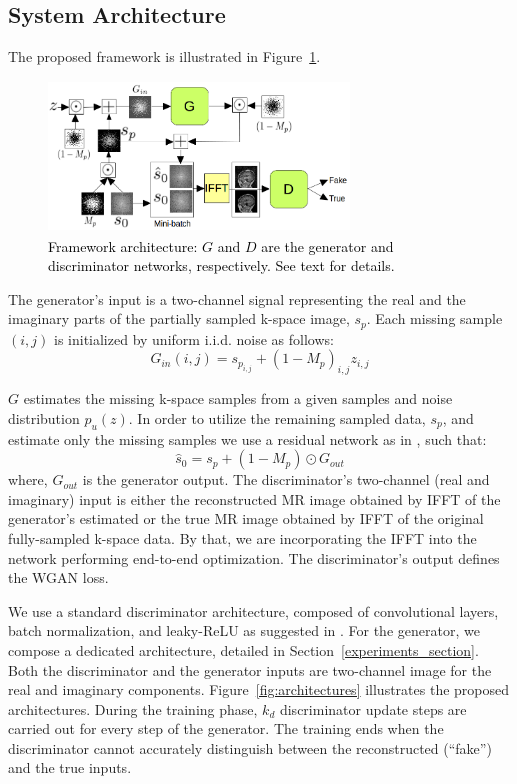 \documentclass[10pt,journal,compsoc]{IEEEtran}
\begin{document}
\subsection{System Architecture}
The proposed framework is illustrated in Figure~\ref{fig:system}.
\begin{figure}[H]
	\centering{}\includegraphics[width=8.0cm,height=4cm]{include/grp2/system_chart}\caption{\label{fig:system} \textcolor{black}{\footnotesize{}{}Framework
			architecture: $G$ and $D$ are the generator and discriminator networks,
			respectively. See text for details.}}
\end{figure}

The generator's input is a two-channel signal representing the real and the imaginary parts of the partially sampled k-space image, $s_{p}$. Each missing sample $\left(i,j\right)$ is initialized by uniform i.i.d. noise as follows: 
\begin{equation}
G_{in}\left(i,j\right)=s_{p_{i,j}}+\left(1-M_{p}\right)_{i,j}z_{i,j}
\end{equation}

$G$ estimates the missing k-space samples from a given samples and noise distribution $p_{u}\left(z\right)$. In order to utilize the remaining sampled data, $s_{p}$, and estimate only the missing samples we use a residual network \cite{he2016deep} as in \cite{Oktay2016}, such that:
\begin{equation}
\hat{s}_{0}=s_{p}+\left(1-M_{p}\right)\odot G_{out}
\end{equation}
where, $G_{out}$ is the generator output. The discriminator's two-channel (real and imaginary) input is either the reconstructed MR image obtained by IFFT of the generator's estimated or the true MR image obtained by IFFT of the original fully-sampled k-space data. By that, we are incorporating the IFFT into the network performing end-to-end optimization. The discriminator's output defines the WGAN loss.

We use a standard discriminator architecture, composed of convolutional layers, batch normalization, and leaky-ReLU as suggested in \cite{radford2015unsupervised}. For the generator, we compose a dedicated architecture, detailed in Section~\ref{experiments_section}. Both the discriminator and the generator inputs are two-channel image for the real and imaginary components. Figure~\ref{fig:architectures} illustrates the proposed architectures. During the training phase, $k_{d}$ discriminator update steps are carried out for every step of the generator. The training ends when the discriminator cannot accurately distinguish between the reconstructed (``fake'') and the true inputs.
\end{document}
